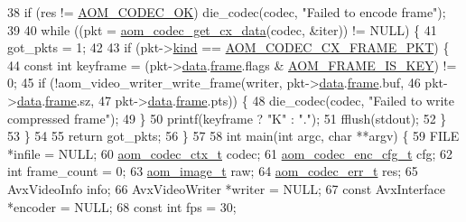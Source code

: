 \begin{DoxyCodeInclude}
{38   \textcolor{keywordflow}{if} (res != \hyperlink{group__codec_ggaaae61e0f8663e6137f1e228757248e7caf145dc2f86014a08ebad36ac2b140001}{AOM\_CODEC\_OK}) die\_codec(codec, \textcolor{stringliteral}{"Failed to encode frame"});
39 
40   \textcolor{keywordflow}{while} ((pkt = \hyperlink{group__encoder_gaedc4c56b60d4217677cb561066360884}{aom\_codec\_get\_cx\_data}(codec, &iter)) != NULL) \{
41     got\_pkts = 1;
42 
43     \textcolor{keywordflow}{if} (pkt->\hyperlink{structaom__codec__cx__pkt_a11e586120c689ece9a7690e72ff384be}{kind} == \hyperlink{group__encoder_ggafeb69da4a9649a54e805f59c26d8dfeda793165d0f219812342f69d5fd9b2b9c8}{AOM\_CODEC\_CX\_FRAME\_PKT}) \{
44       \textcolor{keyword}{const} \textcolor{keywordtype}{int} keyframe = (pkt->\hyperlink{structaom__codec__cx__pkt_afb379cd4bfa7692d1d6e85f4e4b2b410}{data}.\hyperlink{structaom__codec__cx__pkt_a4180a6ae59b0d295bc915d4689df4cb0}{frame}.flags & \hyperlink{group__encoder_gaf4a58f123913a5eef0a3796f0619e5f3}{AOM\_FRAME\_IS\_KEY}) != 0;
45       \textcolor{keywordflow}{if} (!aom\_video\_writer\_write\_frame(writer, pkt->\hyperlink{structaom__codec__cx__pkt_afb379cd4bfa7692d1d6e85f4e4b2b410}{data}.\hyperlink{structaom__codec__cx__pkt_a4180a6ae59b0d295bc915d4689df4cb0}{frame}.buf,
46                                         pkt->\hyperlink{structaom__codec__cx__pkt_afb379cd4bfa7692d1d6e85f4e4b2b410}{data}.\hyperlink{structaom__codec__cx__pkt_a4180a6ae59b0d295bc915d4689df4cb0}{frame}.sz,
47                                         pkt->\hyperlink{structaom__codec__cx__pkt_afb379cd4bfa7692d1d6e85f4e4b2b410}{data}.\hyperlink{structaom__codec__cx__pkt_a4180a6ae59b0d295bc915d4689df4cb0}{frame}.pts)) \{
48         die\_codec(codec, \textcolor{stringliteral}{"Failed to write compressed frame"});
49       \}
50       printf(keyframe ? \textcolor{stringliteral}{"K"} : \textcolor{stringliteral}{"."});
51       fflush(stdout);
52     \}
53   \}
54 
55   \textcolor{keywordflow}{return} got\_pkts;
56 \}
57 
58 \textcolor{keywordtype}{int} main(\textcolor{keywordtype}{int} argc, \textcolor{keywordtype}{char} **argv) \{
59   FILE *infile = NULL;
60   \hyperlink{structaom__codec__ctx}{aom\_codec\_ctx\_t} codec;
61   \hyperlink{structaom__codec__enc__cfg}{aom\_codec\_enc\_cfg\_t} cfg;
62   \textcolor{keywordtype}{int} frame\_count = 0;
63   \hyperlink{structaom__image}{aom\_image\_t} raw;
64   \hyperlink{group__codec_gaaae61e0f8663e6137f1e228757248e7c}{aom\_codec\_err\_t} res;
65   AvxVideoInfo info;
66   AvxVideoWriter *writer = NULL;
67   \textcolor{keyword}{const} AvxInterface *encoder = NULL;
68   \textcolor{keyword}{const} \textcolor{keywordtype}{int} fps = 30;
}
\end{DoxyCodeInclude}
